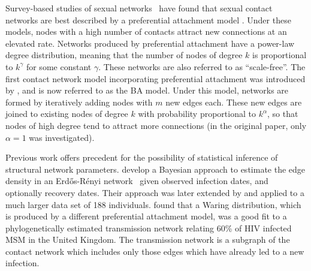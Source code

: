 \documentclass[12pt]{article}\usepackage[]{graphicx}\usepackage[]{color}
\begin{document}
Survey-based studies of sexual networks~\autocite{liljeros2001web,
schneeberger2004scale} have found that sexual contact networks are best
described by a preferential attachment model \autocite[although there has been
some disagreement, see][]{jones2003assessment}. Under these models, nodes with
a high number of contacts attract new connections at an elevated rate. Networks
produced by preferential attachment have a power-law degree distribution,
meaning that the number of nodes of degree $k$ is proportional to $k^\gamma$
for some constant $\gamma$. These networks are also referred to as
``scale-free''. The first contact network model incorporating preferential
attachment was introduced by \textcite{barabasi1999emergence}, and is now
referred to as the \gls{BA} model. Under this model, networks are formed by
iteratively adding nodes with $m$ new edges each. These new edges are joined to
existing nodes of degree $k$ with probability proportional to $k^\alpha$, so
that nodes of high degree tend to attract more connections (in the original
paper, only $\alpha = 1$ was investigated).

Previous work offers precedent for the possibility of statistical inference of
structural network parameters. \textcite{britton2002bayesian} develop a
Bayesian approach to estimate the edge density in an Erd\H{o}s-R\'enyi
network~\autocite{erdos1960evolution} given observed infection dates, and
optionally recovery dates. Their approach was later extended by
\textcite{groendyke2011bayesian} and applied to a much larger data set of 188
individuals. \textcite{brown2011transmission} found that a Waring distribution,
which is produced by a different preferential attachment model, was a good fit
to a phylogenetically estimated transmission network relating 60\% of HIV
infected \gls{MSM} in the United Kingdom. The transmission network is a
subgraph of the contact network which includes only those edges which have
already led to a new infection. 
\end{document}
